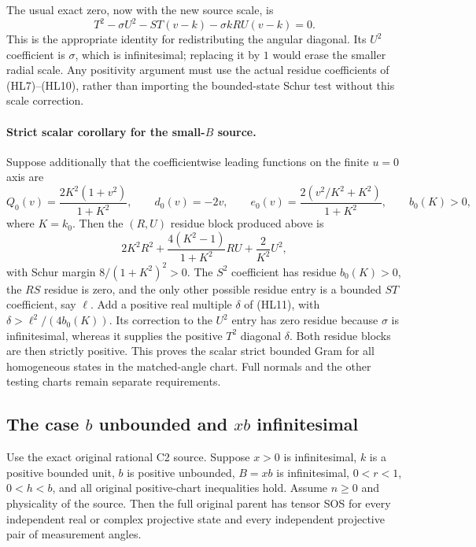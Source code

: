 The usual exact zero, now with the new source scale, is
\[
 T^2-\sigma U^2-ST(v-k)-\sigma kRU(v-k)=0.          \tag{HL11}
\]
This is the appropriate identity for redistributing the angular
diagonal.  Its $U^2$ coefficient is $\sigma$, which is infinitesimal;
replacing it by $1$ would erase the smaller radial scale.  Any
positivity argument must use the actual residue coefficients of
(HL7)--(HL10), rather than importing the bounded-state Schur test
without this scale correction.

\paragraph{Strict scalar corollary for the small-$B$ source.}
Suppose additionally that the coefficientwise leading functions on
the finite $u=0$ axis are
\[
 Q_0(v)=\frac{2K^2(1+v^2)}{1+K^2},\qquad
 d_0(v)=-2v,\qquad
 e_0(v)=\frac{2(v^2/K^2+K^2)}{1+K^2},
 \qquad b_0(K)>0,
\]
where $K=k_0$.  Then the $(R,U)$ residue block produced above is
\[
 2K^2R^2+\frac{4(K^2-1)}{1+K^2}RU+\frac2{K^2}U^2,
\]
with Schur margin $8/(1+K^2)^2>0$.  The $S^2$ coefficient has
residue $b_0(K)>0$, the $RS$ residue is zero, and the only other
possible residue entry is a bounded $ST$ coefficient, say $\ell$.
Add a positive real multiple $\delta$ of (HL11), with
$\delta>\ell^2/(4b_0(K))$.  Its correction to the $U^2$ entry has
zero residue because $\sigma$ is infinitesimal, whereas it supplies
the positive $T^2$ diagonal $\delta$.  Both residue blocks are then
strictly positive.  This proves the scalar strict bounded Gram for
all homogeneous states in the matched-angle chart.  Full normals
and the other testing charts remain separate requirements.

\subsection{The case $b$ unbounded and $xb$ infinitesimal}
\label{component:pab6222b899ef}

\label{pab6222b899ef:sec:c2-unbounded-b-small-B}

\begin{theorem}
Use the exact original rational C2 source.  Suppose $x>0$ is
infinitesimal, $k$ is a positive bounded unit, $b$ is positive
unbounded, $B=xb$ is infinitesimal, $0<r<1$, $0<h<b$, and all
original positive-chart inequalities hold.  Assume $n\geq0$ and
physicality of the source.  Then the full original parent has tensor
SOS for every independent real or complex projective state and
every independent projective pair of measurement angles.
\end{theorem}

